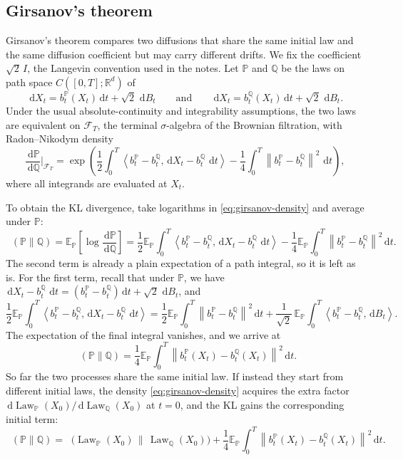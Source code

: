 \documentclass[10pt,a4paper]{amsart}
\numberwithin{equation}{section}
\DeclareMathOperator{\KL}{D_{\mathsf{KL}}}
\DeclareMathOperator{\Law}{Law}
\newcommand{\R}{\mathbb{R}}
\newcommand{\E}{\mathbb{E}}
\newcommand{\Pp}{\mathbb{P}}
\newcommand{\dd}{\,\mathrm{d}}
\newcommand{\Id}{I}
\newcommand{\cF}{\mathcal{F}}
\newcommand{\norm}[1]{\left\lVert #1 \right\rVert}
\newcommand{\ip}[2]{\left\langle #1,#2 \right\rangle}
\begin{document}
\subsection*{Girsanov's theorem}

Girsanov's theorem compares two diffusions that share the same initial law and
the same diffusion coefficient but may carry different drifts.  We fix the
coefficient $\sqrt2\,\Id$, the Langevin convention used in the notes.  Let $\Pp$
and $\mathbb{Q}$ be the laws on path space $C([0,T];\R^d)$ of
\[
    \dd X_t=b^\Pp_t(X_t)\dd t+\sqrt2\,\dd B_t
    \qquad\text{and}\qquad
    \dd X_t=b^{\mathbb{Q}}_t(X_t)\dd t+\sqrt2\,\dd B_t.
\]
Under the usual absolute-continuity and integrability assumptions, the two laws
are equivalent on $\cF_T$, the terminal $\sigma$-algebra of the Brownian filtration, with Radon--Nikodym density
\begin{equation}\label{eq:girsanov-density}
    \frac{\dd \Pp}{\dd \mathbb{Q}}\bigg|_{\cF_T}
    =
    \exp\!\left(
    \frac12\int_0^T \ip{b^\Pp_t-b^{\mathbb{Q}}_t}{\dd X_t-b^{\mathbb{Q}}_t\,\dd t}
    -
    \frac14\int_0^T \norm{b^\Pp_t-b^{\mathbb{Q}}_t}^2\,\dd t
    \right),
\end{equation}
where all integrands are evaluated at $X_t$.

To obtain the KL divergence, take logarithms in \eqref{eq:girsanov-density} and
average under $\Pp$:
\[
    \KL(\Pp\|\mathbb{Q})
    =
    \E_\Pp\!\left[\log\frac{\dd \Pp}{\dd \mathbb{Q}}\right]
    =
    \frac12\E_\Pp\int_0^T \ip{b^\Pp_t-b^{\mathbb{Q}}_t}{\dd X_t-b^{\mathbb{Q}}_t\,\dd t}
    -
    \frac14\E_\Pp\int_0^T\norm{b^\Pp_t-b^{\mathbb{Q}}_t}^2\dd t.
\]
The second term is already a plain expectation of a path integral, so it is left
as is.  For the first term, recall that under $\Pp$, we have $\dd X_t-b^{\mathbb{Q}}_t\,\dd t=(b^\Pp_t-b^{\mathbb{Q}}_t)\dd t+\sqrt2\,\dd B_t$, and
\[
    \frac12\E_\Pp\int_0^T \ip{b^\Pp_t-b^{\mathbb{Q}}_t}{\dd X_t-b^{\mathbb{Q}}_t\,\dd t}
    =
    \frac12\E_\Pp\int_0^T\norm{b^\Pp_t-b^{\mathbb{Q}}_t}^2\dd t
    +
    \frac{1}{\sqrt2}\,\E_\Pp\int_0^T\ip{b^\Pp_t-b^{\mathbb{Q}}_t}{\dd B_t}.
\]
The expectation of the final integral vanishes, and we arrive at
\begin{equation}\label{eq:girsanov-kl}
    \KL(\Pp\|\mathbb{Q}) = \frac14 \E_{\Pp}\int_0^T \norm{b^\Pp_t(X_t)-b^{\mathbb{Q}}_t(X_t)}^2\dd t.
\end{equation}
So far the two processes share the same initial law.  If instead they start from
different initial laws, the density \eqref{eq:girsanov-density} acquires the
extra factor $\dd\Law_\Pp(X_0)/\dd\Law_{\mathbb{Q}}(X_0)$ at $t=0$, and the KL gains the
corresponding initial term:
\[
    \KL(\Pp\|\mathbb{Q})
    =
    \KL\bigl(\Law_\Pp(X_0)\,\big\|\,\Law_{\mathbb{Q}}(X_0)\bigr)
    +
    \frac14\E_\Pp\int_0^T\norm{b^\Pp_t(X_t)-b^{\mathbb{Q}}_t(X_t)}^2\dd t.
\]
\end{document}
